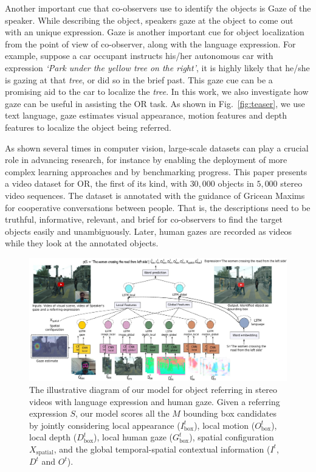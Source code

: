\documentclass[10pt,twocolumn,letterpaper]{article}
\begin{document}
Another important cue that co-observers use to identify the objects is Gaze of the speaker. While describing the object, speakers gaze at the object to come out with an unique expression. Gaze is another important cue for object localization from the point of view of co-observer, along with the language expression. For example, suppose a car occupant instructs his/her autonomous car with expression \emph{`Park under the yellow tree on the right'}, it is highly likely that he/she is gazing at that \emph{tree}, or did so in the brief past. This gaze cue can be a promising aid to the car to localize the \emph{tree}. In this work, we also investigate how gaze can be useful in assisting the OR task. As shown in Fig.~\ref{fig:teaser}, we use text language, gaze estimates visual appearance, motion features and depth features to localize the object being referred.

As shown several times in computer vision, large-scale datasets can
play a crucial role in advancing research, for instance by enabling
the deployment of more complex learning approaches and by benchmarking
progress. This paper presents a video dataset for OR, the first of its
kind, with $30,000$ objects in $5,000$ stereo video sequences. The
dataset is annotated with the guidance of Gricean
Maxims~\cite{Logic:conversation} for cooperative conversations between
people.  That is, the descriptions need to be truthful, informative,
relevant, and brief for co-observers to find the target objects easily
and unambiguously. Later, human gazes are recorded as videos while
they look at the annotated objects.

\begin{figure}[t]
\includegraphics[width=1\linewidth]{pipeline.jpg}
\caption{The illustrative diagram of our model for object referring in
  stereo videos with language expression and human gaze. Given a
  referring expression $S$, our model scores all the $M$ bounding box
  candidates by jointly considering local appearance
  ($I_{\text{box}}^t$), local motion ($O_{\text{box}}^t$), local depth
  ($D_{\text{box}}^t$), local human gaze ($G_{\text{box}}^t$), spatial
  configuration $X_{\text{spatial}}$, and the global temporal-spatial
  contextual information ($I^t$, $D^t$ and $O^t$).}
\label{fig:pipeline}
\end{figure}
\end{document}
